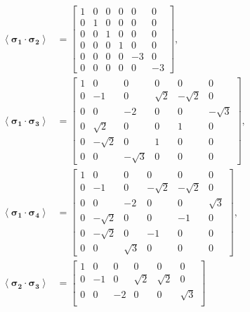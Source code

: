 \documentclass[prd,twocolumn,floatfix,nofootinbib]{revtex4}
\begin{document}
    \begin{align}
        \left\langle \boldsymbol{\sigma_{1}}\cdot \boldsymbol{\sigma_{2}} \right\rangle&=
        \begin{bmatrix}
            1 & 0 & 0 & 0 & 0 & 0 \\
            0 & 1 & 0 & 0 & 0 & 0 \\
            0 & 0 & 1 & 0 & 0 & 0 \\
            0 & 0 & 0 & 1 & 0 & 0 \\
            0 & 0 & 0 & 0 & -3 & 0 \\
            0 & 0 & 0 & 0 & 0 & -3
        \end{bmatrix}, \\
        \left\langle \boldsymbol{\sigma_{1}}\cdot \boldsymbol{\sigma_{3}} \right\rangle&=
        \begin{bmatrix}
            1 & 0 & 0 & 0 & 0 & 0 \\
            0 & -1 & 0 & \sqrt{2} & -\sqrt{2} & 0 \\
            0 & 0 & -2 & 0 & 0 & -\sqrt{3} \\
            0 & \sqrt{2} & 0 & 0 & 1 & 0 \\
            0 & -\sqrt{2} & 0 & 1 & 0 & 0 \\
            0 & 0 & -\sqrt{3} & 0 & 0 & 0
        \end{bmatrix}, \\
        \left\langle \boldsymbol{\sigma_{1}}\cdot \boldsymbol{\sigma_{4}} \right\rangle&=
        \begin{bmatrix}
            1 & 0 & 0 & 0 & 0 & 0 \\
            0 & -1 & 0 & -\sqrt{2} & -\sqrt{2} & 0 \\
            0 & 0 & -2 & 0 & 0 & \sqrt{3} \\
            0 & -\sqrt{2} & 0 & 0 & -1 & 0 \\
            0 & -\sqrt{2} & 0 & -1 & 0 & 0 \\
            0 & 0 & \sqrt{3} & 0 & 0 & 0
        \end{bmatrix}, \\
        \left\langle \boldsymbol{\sigma_{2}}\cdot \boldsymbol{\sigma_{3}} \right\rangle&=
        \begin{bmatrix}
            1 & 0 & 0 & 0 & 0 & 0 \\
            0 & -1 & 0 & \sqrt{2} & \sqrt{2} & 0 \\
            0 & 0 & -2 & 0 & 0 & \sqrt{3} \\

\end{bmatrix}
\end{align}
\end{document}
